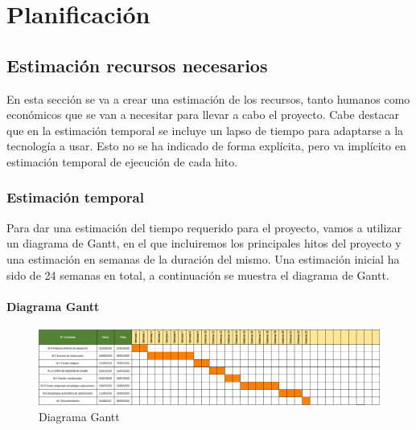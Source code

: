 \chapter {Planificación}

\section{Estimación recursos necesarios}
\begin{text}
	En esta sección se va a crear una estimación de los recursos, tanto humanos como económicos que se van a necesitar para llevar a cabo el proyecto. Cabe destacar que en la estimación temporal se incluye un lapso de tiempo para adaptarse a la tecnología a usar. Esto no se ha indicado de forma explícita, pero va implícito en estimación temporal de ejecución de cada hito. \\ 
	
\end{text}
\subsection{Estimación temporal}
\begin{text}
	Para dar una estimación del tiempo requerido para el proyecto, vamos a utilizar un diagrama de Gantt, en el que incluiremos los principales hitos del proyecto y una estimación en semanas de la duración del mismo. Una estimación inicial ha sido de 24 semanas en total, a continuación se muestra el diagrama de Gantt.
\end{text}

\newpage
\subsubsection{Diagrama Gantt}
	\begin{figure}[!hbt]
		\centering
		\includegraphics[scale=0.4,angle=-90]{imagenes/Planificacion/gannt2.png}
		\caption[Diagrama Gantt]{Diagrama Gantt \cite{Gantt:online}} 
		\label{Diagrama Gannt}
	\end{figure}
\clearpage
